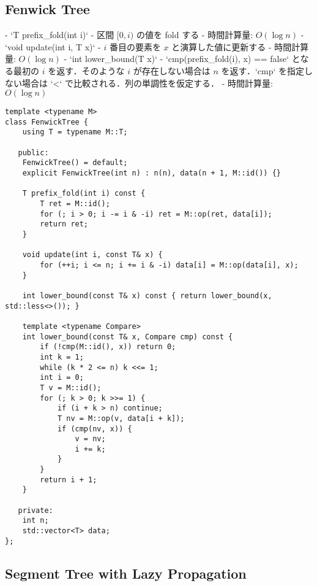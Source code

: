 \subsection{Fenwick Tree}

\begin{small}
\begin{markdown}
- `T prefix\_fold(int i)`
    - 区間 $[0, i)$ の値を fold する
    - 時間計算量: $O(\log n)$
- `void update(int i, T x)`
    - $i$ 番目の要素を $x$ と演算した値に更新する
    - 時間計算量: $O(\log n)$
- `int lower\_bound(T x)`
    - `cmp(prefix\_fold(i), x) == false` となる最初の $i$ を返す．そのような $i$ が存在しない場合は $n$ を返す．`cmp` を指定しない場合は `<` で比較される．列の単調性を仮定する．
    - 時間計算量: $O(\log n)$

\end{markdown}
\end{small}

\begin{lstlisting}
template <typename M>
class FenwickTree {
    using T = typename M::T;

   public:
    FenwickTree() = default;
    explicit FenwickTree(int n) : n(n), data(n + 1, M::id()) {}

    T prefix_fold(int i) const {
        T ret = M::id();
        for (; i > 0; i -= i & -i) ret = M::op(ret, data[i]);
        return ret;
    }

    void update(int i, const T& x) {
        for (++i; i <= n; i += i & -i) data[i] = M::op(data[i], x);
    }

    int lower_bound(const T& x) const { return lower_bound(x, std::less<>()); }

    template <typename Compare>
    int lower_bound(const T& x, Compare cmp) const {
        if (!cmp(M::id(), x)) return 0;
        int k = 1;
        while (k * 2 <= n) k <<= 1;
        int i = 0;
        T v = M::id();
        for (; k > 0; k >>= 1) {
            if (i + k > n) continue;
            T nv = M::op(v, data[i + k]);
            if (cmp(nv, x)) {
                v = nv;
                i += k;
            }
        }
        return i + 1;
    }

   private:
    int n;
    std::vector<T> data;
};
\end{lstlisting}

\subsection{Segment Tree with Lazy Propagation}

